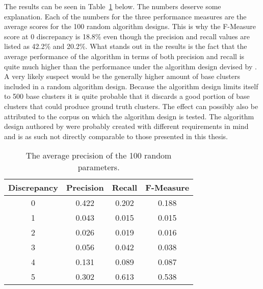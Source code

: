 The results can be seen in Table~\ref{tab:randomparamsresult} below. The numbers deserve some explanation. Each of the numbers for the three performance measures are the average scores for the 100 random algorithm designs. This is why the F-Measure score at 0 discrepancy is 18.8\% even though the precision and recall values are listed as 42.2\% and 20.2\%. What stands out in the results is the fact that the average performance of the algorithm in terms of both precision and recall is quite much higher than the performance under the algorithm design devised by \cite{Oren1998}. A very likely suspect would be the generally higher amount of base clusters included in a random algorithm design. Because the \citeauthor{Oren1998} algorithm design limits itself to 500 base clusters it is quite probable that it discards a good portion of base clusters that could produce ground truth clusters. The effect can possibly also be attributed to the corpus on which the algorithm design is tested. The algorithm design authored by \citeauthor{Oren1998} were probably created with different requirements in mind and is as such not directly comparable to those presented in this thesis.

\begin{table}[H]
\begin{center}
\begin{tabular}{|c|ccc|}
\hline
Discrepancy & Precision & Recall & F-Measure\\ 
\hline
0 & 0.422 & 0.202 & 0.188\\
1 & 0.043 & 0.015 & 0.015\\
2 & 0.026 & 0.019 & 0.016\\
3 & 0.056 & 0.042 & 0.038\\
4 & 0.131 & 0.089 & 0.087\\
5 & 0.302 & 0.613 & 0.538\\
\hline
\end{tabular}
\end{center}
\caption{The average precision of the 100 random parameters.}
\label{tab:randomparamsresult}
\end{table}



